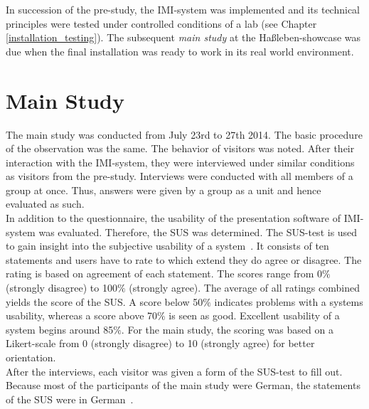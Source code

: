 In succession of the pre-study, the \ac{IMI}-system was implemented and its technical principles were tested under controlled conditions of a lab (see Chapter \ref{installation_testing}). The subsequent \textit{main study} at the Haßleben-showcase was due when the final installation was ready to work in its real world environment.


\section{Main Study}
\label{evaluation_study}

The main study was conducted from July 23rd to 27th 2014. The basic procedure of the observation was the same. The behavior of visitors was noted. After their interaction with the \ac{IMI}-system, they were interviewed under similar conditions as visitors from the pre-study. Interviews were conducted with all members of a group at once. Thus, answers were given by a group as a unit and hence evaluated as such. 
\\
In addition to the questionnaire, the usability of the presentation software of \ac{IMI}-system was evaluated. Therefore, the \ac{SUS} was determined. The \ac{SUS}-test is used to gain insight into the subjective usability of a system~\cite{SUStest}. It consists of ten statements and users have to rate to which extend they do agree or disagree. The rating is based on agreement of each statement. The scores range from 0$\%$ (strongly disagree) to 100$\%$ (strongly agree). The average of all ratings combined yields the score of the \ac{SUS}. A score below 50$\%$ indicates problems with a systems usability, whereas a score above 70$\%$ is seen as good. Excellent usability of a system begins around 85$\%$. For the main study, the scoring was based on a Likert-scale from 0 (strongly disagree) to 10 (strongly agree) for better orientation.
\\
After the interviews, each visitor was given a form of the \ac{SUS}-test to fill out. Because most of the participants of the main study were German, the statements of the \ac{SUS} were in German~\cite{SUSdeu}.
 
